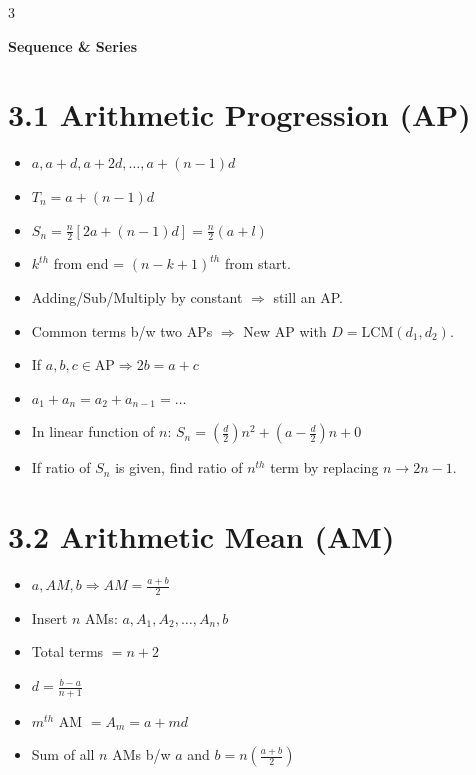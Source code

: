 \documentclass[11pt,a4paper,landscape]{article}
\begin{document}
\newpage
\begin{multicols*}{3}

\textbf{\Huge Sequence \& Series}

\section*{3.1 Arithmetic Progression (AP)}
\begin{itemize}
\item $a, a+d, a+2d, \dots, a+(n-1)d$
\item $T_n = a + (n-1)d$
\item $S_n = \frac{n}{2}[2a + (n-1)d] = \frac{n}{2}(a + l)$
\item $k^{th}$ from end = $(n-k+1)^{th}$ from start.
\item Adding/Sub/Multiply by constant $\Rightarrow$ still an AP.
\item Common terms b/w two APs $\Rightarrow$ New AP with $D = \text{LCM}(d_1, d_2)$.
\item If $a,b,c \in \text{AP} \Rightarrow 2b = a+c$
\item $a_1 + a_n = a_2 + a_{n-1} = \dots$
\item In linear function of $n$: $S_n = \left(\frac{d}{2}\right)n^2 + \left(a-\frac{d}{2}\right)n + 0$
\item If ratio of $S_n$ is given, find ratio of $n^{th}$ term by replacing $n \rightarrow 2n-1$.
\end{itemize}

\section*{3.2 Arithmetic Mean (AM)}
\begin{itemize}
\item $a, AM, b \Rightarrow AM = \frac{a+b}{2}$
\item Insert $n$ AMs: $a, A_1, A_2, \dots, A_n, b$
\item Total terms $= n+2$
\item $d = \frac{b-a}{n+1}$
\item $m^{th}$ AM $= A_m = a+md$
\item Sum of all $n$ AMs b/w $a$ and $b = n\left(\frac{a+b}{2}\right)$
\end{itemize}


\end{multicols*}
\end{document}
